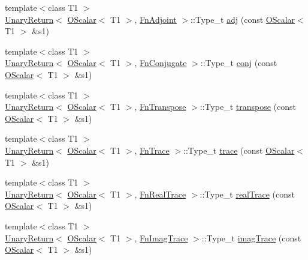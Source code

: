 \begin{DoxyCompactItemize}
\item 
{\footnotesize template$<$class T1 $>$ }\\\mbox{\hyperlink{structENSEM_1_1UnaryReturn}{Unary\+Return}}$<$ \mbox{\hyperlink{classENSEM_1_1OScalar}{O\+Scalar}}$<$ T1 $>$, \mbox{\hyperlink{structENSEM_1_1FnAdjoint}{Fn\+Adjoint}} $>$\+::Type\+\_\+t \mbox{\hyperlink{group__obsscalar_ga08302e6d2883f4f095a5e579bce6b2b8}{adj}} (const \mbox{\hyperlink{classENSEM_1_1OScalar}{O\+Scalar}}$<$ T1 $>$ \&s1)
\item 
{\footnotesize template$<$class T1 $>$ }\\\mbox{\hyperlink{structENSEM_1_1UnaryReturn}{Unary\+Return}}$<$ \mbox{\hyperlink{classENSEM_1_1OScalar}{O\+Scalar}}$<$ T1 $>$, \mbox{\hyperlink{structENSEM_1_1FnConjugate}{Fn\+Conjugate}} $>$\+::Type\+\_\+t \mbox{\hyperlink{group__obsscalar_gad6c32f4ab79b8017fc993162435d1d72}{conj}} (const \mbox{\hyperlink{classENSEM_1_1OScalar}{O\+Scalar}}$<$ T1 $>$ \&s1)
\item 
{\footnotesize template$<$class T1 $>$ }\\\mbox{\hyperlink{structENSEM_1_1UnaryReturn}{Unary\+Return}}$<$ \mbox{\hyperlink{classENSEM_1_1OScalar}{O\+Scalar}}$<$ T1 $>$, \mbox{\hyperlink{structENSEM_1_1FnTranspose}{Fn\+Transpose}} $>$\+::Type\+\_\+t \mbox{\hyperlink{group__obsscalar_ga6af2d66b673bc2683558f88c9eac327e}{transpose}} (const \mbox{\hyperlink{classENSEM_1_1OScalar}{O\+Scalar}}$<$ T1 $>$ \&s1)
\item 
{\footnotesize template$<$class T1 $>$ }\\\mbox{\hyperlink{structENSEM_1_1UnaryReturn}{Unary\+Return}}$<$ \mbox{\hyperlink{classENSEM_1_1OScalar}{O\+Scalar}}$<$ T1 $>$, \mbox{\hyperlink{structENSEM_1_1FnTrace}{Fn\+Trace}} $>$\+::Type\+\_\+t \mbox{\hyperlink{group__obsscalar_ga86ed3e3adf57442824b4275e5ea2a3fd}{trace}} (const \mbox{\hyperlink{classENSEM_1_1OScalar}{O\+Scalar}}$<$ T1 $>$ \&s1)
\item 
{\footnotesize template$<$class T1 $>$ }\\\mbox{\hyperlink{structENSEM_1_1UnaryReturn}{Unary\+Return}}$<$ \mbox{\hyperlink{classENSEM_1_1OScalar}{O\+Scalar}}$<$ T1 $>$, \mbox{\hyperlink{structENSEM_1_1FnRealTrace}{Fn\+Real\+Trace}} $>$\+::Type\+\_\+t \mbox{\hyperlink{group__obsscalar_ga3314cb92fadaf86f0fa6dfe446ddc388}{real\+Trace}} (const \mbox{\hyperlink{classENSEM_1_1OScalar}{O\+Scalar}}$<$ T1 $>$ \&s1)
\item 
{\footnotesize template$<$class T1 $>$ }\\\mbox{\hyperlink{structENSEM_1_1UnaryReturn}{Unary\+Return}}$<$ \mbox{\hyperlink{classENSEM_1_1OScalar}{O\+Scalar}}$<$ T1 $>$, \mbox{\hyperlink{structENSEM_1_1FnImagTrace}{Fn\+Imag\+Trace}} $>$\+::Type\+\_\+t \mbox{\hyperlink{group__obsscalar_ga1dff0d4b73bbb026e6a9287ffd531523}{imag\+Trace}} (const \mbox{\hyperlink{classENSEM_1_1OScalar}{O\+Scalar}}$<$ T1 $>$ \&s1)

\end{DoxyCompactItemize}
